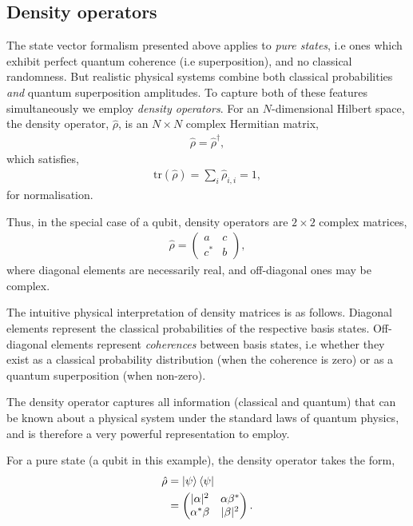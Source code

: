 \documentclass[aps,pra,twocolumn,amsmath,amssymb,nofootinbib,superscriptaddress]{revtex4}
\begin{document}
%
%

\subsection{Density operators}

The state vector formalism presented above applies to \textit{pure states}, i.e ones which exhibit perfect quantum coherence (i.e superposition), and no classical randomness. But realistic physical systems combine both classical probabilities \textit{and} quantum superposition amplitudes. To capture both of these features simultaneously we employ \textit{density operators}. For an $N$-dimensional Hilbert space, the density operator, $\hat\rho$, is an \mbox{$N\times N$} complex Hermitian matrix,
\begin{align}
	\hat\rho = \hat\rho^\dag,
\end{align}
which satisfies,
\begin{align}
\mathrm{tr}(\hat\rho)=\sum_i \hat\rho_{i,i} = 1,	
\end{align}
for normalisation.

Thus, in the special case of a qubit, density operators are \mbox{$2\times 2$} complex matrices,
\begin{align}
\hat\rho = \left(\begin{matrix}{}
  a & c \nonumber\\
  c^* & b
\end{matrix}\right),
\end{align}
where diagonal elements are necessarily real, and off-diagonal ones may be complex.

The intuitive physical interpretation of density matrices is as follows. Diagonal elements represent the classical probabilities of the respective basis states. Off-diagonal elements represent \textit{coherences} between basis states, i.e whether they exist as a classical probability distribution (when the coherence is zero) or as a quantum superposition (when non-zero).

The density operator captures all information (classical and quantum) that can be known about a physical system under the standard laws of quantum physics, and is therefore a very powerful representation to employ.

For a pure state (a qubit in this example), the density operator takes the form,
\begin{align}
\hat\rho &= \ket\psi\bra\psi\nonumber\\
&= \left(\begin{matrix}{}
  |\alpha|^2 & \alpha\beta^* \nonumber\\
  \alpha^*\beta & |\beta|^2
\end{matrix}\right).
\end{align}
\end{document}
